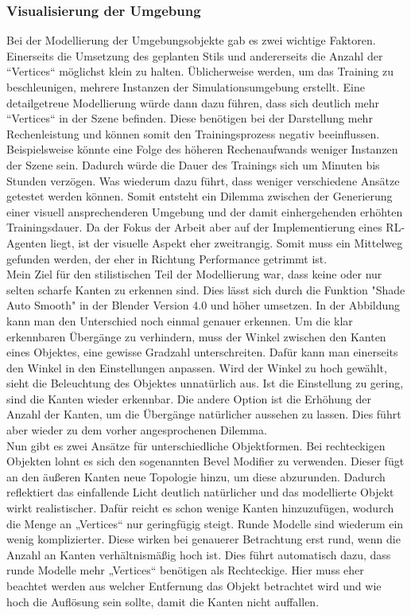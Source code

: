 \subsubsection{Visualisierung der Umgebung}
\label{vis_umgebung}
Bei der Modellierung der Umgebungsobjekte gab es zwei wichtige Faktoren. Einerseits die Umsetzung des geplanten Stils und andererseits die Anzahl der “Vertices“ möglichst klein zu halten. Üblicherweise werden, um das Training zu beschleunigen, mehrere Instanzen der Simulationsumgebung erstellt. Eine detailgetreue Modellierung würde dann dazu führen, dass sich deutlich mehr “Vertices“ in der Szene befinden. Diese benötigen bei der Darstellung mehr Rechenleistung und können somit den Trainingsprozess negativ beeinflussen. Beispielsweise könnte eine Folge des höheren Rechenaufwands weniger Instanzen der Szene sein. Dadurch würde die Dauer des Trainings sich um Minuten bis Stunden verzögen. Was wiederum dazu führt, dass weniger verschiedene Ansätze getestet werden können. Somit entsteht ein Dilemma zwischen der Generierung einer visuell ansprechenderen Umgebung und der damit einhergehenden erhöhten Trainingsdauer. Da der Fokus der Arbeit aber auf der Implementierung eines RL-Agenten liegt, ist der visuelle Aspekt eher zweitrangig. Somit muss ein Mittelweg gefunden werden, der eher in Richtung Performance getrimmt ist. 
\\
Mein Ziel für den stilistischen Teil der Modellierung war, dass keine oder nur selten scharfe Kanten zu erkennen sind. Dies lässt sich durch die Funktion "Shade Auto Smooth" in der Blender Version 4.0 und höher umsetzen. In der Abbildung kann man den Unterschied noch einmal genauer erkennen. Um die klar erkennbaren Übergänge zu verhindern, muss der Winkel zwischen den Kanten eines Objektes, eine gewisse Gradzahl unterschreiten. Dafür kann man einerseits den Winkel in den Einstellungen anpassen. Wird der Winkel zu hoch gewählt, sieht die Beleuchtung des Objektes unnatürlich aus. Ist die Einstellung zu gering, sind die Kanten wieder erkennbar. Die andere Option ist die Erhöhung der Anzahl der Kanten, um die Übergänge natürlicher aussehen zu lassen. Dies führt aber wieder zu dem vorher angesprochenen Dilemma. 
\\
Nun gibt es zwei Ansätze für unterschiedliche Objektformen. Bei rechteckigen Objekten lohnt es sich den sogenannten \dq Bevel Modifier\dq{} zu verwenden. Dieser fügt an den äußeren Kanten neue Topologie hinzu, um diese abzurunden. Dadurch reflektiert das einfallende Licht deutlich natürlicher und das modellierte Objekt wirkt realistischer. Dafür reicht es schon wenige Kanten hinzuzufügen, wodurch die Menge an „Vertices“ nur geringfügig steigt. Runde Modelle sind wiederum ein wenig komplizierter. Diese wirken bei genauerer Betrachtung erst rund, wenn die Anzahl an Kanten verhältnismäßig hoch ist. Dies führt automatisch dazu, dass runde Modelle mehr „Vertices“ benötigen als Rechteckige. Hier muss eher beachtet werden aus welcher Entfernung das Objekt betrachtet wird und wie hoch die Auflösung sein sollte, damit die Kanten nicht auffallen. 
